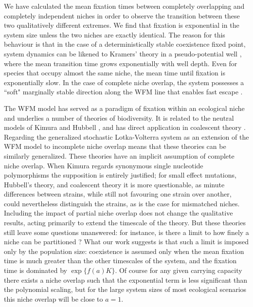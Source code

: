 \documentclass[a4paper,10pt]{article}
\numberwithin{equation}{section} %
\begin{document}
We have calculated the mean fixation times between completely overlapping and completely independent niches in order to observe the transition between these two qualitatively different extremes. %
We find that fixation is exponential in the system size unless the two niches are exactly identical. 
The reason for this behaviour is that in the case of a deterministically stable coexistence fixed point, system dynamics can be likened to Kramers' theory in a pseudo-potential well \cite{Bez1981,Hanggi1990,Ovaskainen2010}, where the mean transition time grows exponentially with well depth. 
Even for species that occupy almost the same niche, the mean time until fixation is exponentially slow. 
In the case of complete niche overlap, the system possesses a ``soft" marginally stable direction along the WFM line that enables fast escape \cite{Dobrinevski2012}. 

The WFM model has served as a paradigm of fixation within an ecological niche and underlies a number of theories of biodiversity. 
It is related to the neutral models of Kimura \cite{Kimura1968} and Hubbell \cite{Hubbell2001}, and has direct application in coalescent theory \cite{Kingman1982}. %
Regarding the generalized stochastic Lotka-Volterra system as an extension of the WFM model to incomplete niche overlap means that these theories can be similarly generalized. 
These theories have an implicit assumption of complete niche overlap. %
When Kimura regards synonymous single nucleotide polymorphisms the supposition is entirely justified; for small effect mutations, Hubbell's theory, and coalescent theory it is more questionable, as minute differences between strains, while still not favouring one strain over another, could nevertheless distinguish the strains, as is the case for mismatched niches. 
Including the impact of partial niche overlap does not change the qualitative results, acting primarily to extend the timescale of the theory. 
But these theories still leave some questions unanswered: for instance, is there a limit to how finely a niche can be partitioned \cite{Chesson2000}? 
What our work suggests is that such a limit is imposed only by the population size: coexistence is assumed only when the mean fixation time is much greater than the other timescales of the system, and the fixation time is dominated by $\exp\{f(a)K\}$. 
Of course for any given carrying capacity there exists a niche overlap such that the exponential term is less significant than the polynomial scaling, but for the large system sizes of most ecological scenarios this niche overlap will be close to $a=1$. 
\end{document}
